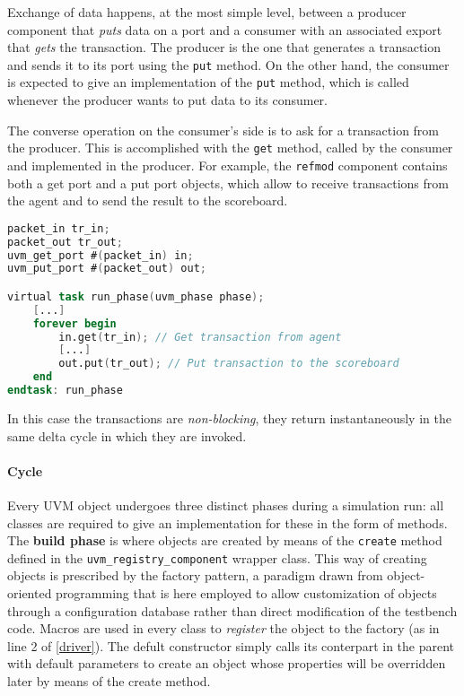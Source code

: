 Exchange of data happens, at the most simple level, between a producer component that \textit{puts} data on a port and a consumer with an associated export that \textit{gets} the transaction. The producer is the one that generates a transaction and sends it to its port using the \texttt{put} method. On the other hand, the consumer is expected to give an implementation of the \texttt{put} method, which is called whenever the producer wants to put data to its consumer. 

The converse operation on the consumer's side is to ask for a transaction from the producer. This is accomplished with the \texttt{get} method, called by the consumer and implemented in the producer.
For example, the \texttt{refmod} component contains both a get port and a put port objects, which allow to receive transactions from the agent and to send the result to the scoreboard.

\begin{lstlisting}[language = verilog, caption = Snippet from \textit{refmod.sv}]
packet_in tr_in;
packet_out tr_out;
uvm_get_port #(packet_in) in;
uvm_put_port #(packet_out) out;

virtual task run_phase(uvm_phase phase);
	[...]
	forever begin
		in.get(tr_in); // Get transaction from agent
		[...]
		out.put(tr_out); // Put transaction to the scoreboard
	end
endtask: run_phase
\end{lstlisting}

In this case the transactions are \textit{non-blocking}, they return instantaneously in the same delta cycle in which they are invoked.

\paragraph{Cycle} Every UVM object undergoes three distinct phases during a simulation run: all classes are required to give an implementation for these in the form of methods.
The \textbf{build phase} is where objects are created by means of the \texttt{create} method defined in the \texttt{uvm\_registry\_component} wrapper class. This way of creating objects is prescribed by the factory pattern, a paradigm drawn from object-oriented programming that is here employed to allow customization of objects through a configuration database rather than direct modification of the testbench code. Macros are used in every class to \textit{register} the object to the factory (as in line 2 of \ref{driver}). The defult constructor simply calls its conterpart in the parent with default parameters to create an object whose properties will be overridden later by means of the create method.

